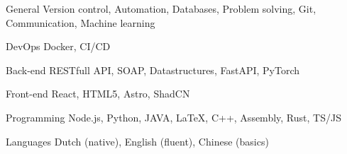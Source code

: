 

\begin{cvskills}

  \cvskill
    {General} %
    {Version control, Automation, Databases, Problem solving, Git, Communication, Machine learning} %

    \cvskill
    {DevOps} %
    {Docker, CI/CD} %

  \cvskill
    {Back-end} %
    {RESTfull API, SOAP, Datastructures, FastAPI, PyTorch} %

  \cvskill
    {Front-end} %
    {React, HTML5, Astro, ShadCN} %

  \cvskill
    {Programming} %
    {Node.js, Python, JAVA, LaTeX, C++, Assembly, Rust, TS/JS} %

  \cvskill
    {Languages} %
    {Dutch (native), English (fluent), Chinese (basics)} %

\end{cvskills}
